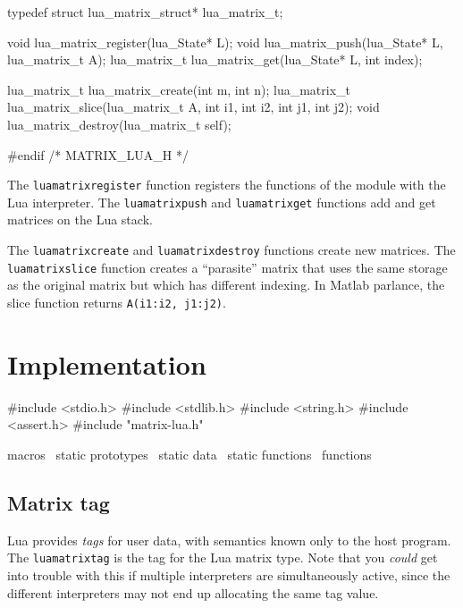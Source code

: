 typedef struct lua_matrix_struct* lua_matrix_t;

void         lua_matrix_register(lua_State* L);
void         lua_matrix_push(lua_State* L, lua_matrix_t A);
lua_matrix_t lua_matrix_get(lua_State* L, int index);

lua_matrix_t lua_matrix_create(int m, int n);
lua_matrix_t lua_matrix_slice(lua_matrix_t A, int i1, int i2, int j1, int j2);
void         lua_matrix_destroy(lua_matrix_t self);

#endif /* MATRIX_LUA_H */
\nwendcode{}\nwdocspar

The {\tt{}lua{}matrix{}register} function registers the functions of
the module with the Lua interpreter.  The {\tt{}lua{}matrix{}push}
and {\tt{}lua{}matrix{}get} functions add and get matrices
on the Lua stack.

The {\tt{}lua{}matrix{}create} and {\tt{}lua{}matrix{}destroy} functions create
new matrices.  The {\tt{}lua{}matrix{}slice} function creates a ``parasite''
matrix that uses the same storage as the original matrix but which
has different indexing.  In Matlab parlance, the slice function returns
{\tt{}A(i1:i2,\ j1:j2)}.


\section{Implementation}

\nwenddocs{}\endmoddef
#include <stdio.h>
#include <stdlib.h>
#include <string.h>
#include <assert.h>
#include "matrix-lua.h"

\LA{}macros~{\nwtagstyle{}}\RA{}
\LA{}static prototypes~{\nwtagstyle{}}\RA{}
\LA{}static data~{\nwtagstyle{}}\RA{}
\LA{}static functions~{\nwtagstyle{}}\RA{}
\LA{}functions~{\nwtagstyle{}}\RA{}
\nwendcode{}\nwdocspar


\subsection{Matrix tag}

Lua provides \emph{tags} for user data, with semantics known only
to the host program.  The {\tt{}lua{}matrix{}tag} is the tag for
the Lua matrix type.  Note that you \emph{could} get into trouble
with this if multiple interpreters are simultaneously active,
since the different interpreters may not end up allocating the same
tag value.

